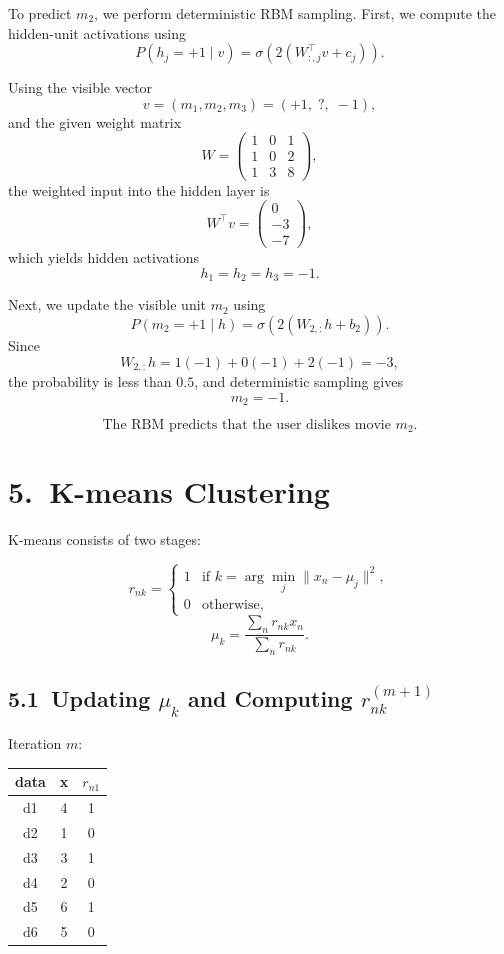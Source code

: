 \documentclass{article}
\begin{document}
To predict \(m_2\), we perform deterministic RBM sampling. First, we compute the hidden-unit
activations using
\[
P(h_j = +1 \mid v)
= \sigma\!\left(2(W_{:,j}^{\top}v + c_j)\right).
\]

Using the visible vector
\[
v = (m_1, m_2, m_3) = (+1,\; ?,\; -1),
\]
and the given weight matrix
\[
W =
\begin{pmatrix}
1 & 0 & 1 \\
1 & 0 & 2 \\
1 & 3 & 8
\end{pmatrix},
\]
the weighted input into the hidden layer is
\[
W^{\top}v =
\begin{pmatrix}
0 \\ -3 \\ -7
\end{pmatrix},
\]
which yields hidden activations
\[
h_1 = h_2 = h_3 = -1.
\]

Next, we update the visible unit \(m_2\) using
\[
P(m_2 = +1 \mid h)
= \sigma\!\left(2(W_{2,:}h + b_2)\right).
\]
Since
\[
W_{2,:}h = 1(-1) + 0(-1) + 2(-1) = -3,
\]
the probability is less than \(0.5\), and deterministic sampling gives
\[
m_2 = -1.
\]

\[
\boxed{
\text{The RBM predicts that the user dislikes movie } m_2.
}
\]

\section*{5.\ K-means Clustering}

K-means consists of two stages:

\[
r_{nk} =
\begin{cases}
1 & \text{if } k = \arg\min_j \|x_n - \mu_j\|^2,\\
0 & \text{otherwise},
\end{cases}
\]
\[
\mu_k = \frac{\sum_n r_{nk} x_n}{\sum_n r_{nk}}.
\]

\subsection*{5.1\ Updating \(\mu_k\) and Computing \(r_{nk}^{(m+1)}\)}

Iteration \(m\):

\begin{center}
\begin{tabular}{|c|c|c|}
\hline
data & x & \(r_{n1}\) \\
\hline
d1 & 4 & 1\\
d2 & 1 & 0\\
d3 & 3 & 1\\
d4 & 2 & 0\\
d5 & 6 & 1\\
d6 & 5 & 0\\
\hline
\end{tabular}
\end{center}
\end{document}
